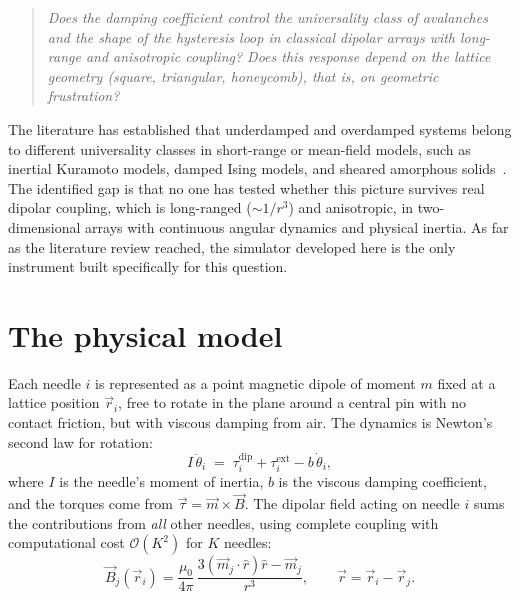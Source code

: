 \documentclass[11pt,a4paper]{article}
\begin{document}
\begin{quote}\itshape
Does the damping coefficient control the universality class of avalanches and the shape of the hysteresis loop in classical dipolar arrays with long-range and anisotropic coupling? Does this response depend on the lattice geometry (square, triangular, honeycomb), that is, on geometric frustration?
\end{quote}

The literature has established that underdamped and overdamped systems belong to different universality classes in short-range or mean-field models, such as inertial Kuramoto models, damped Ising models, and sheared amorphous solids~\cite{dahmen2011}. The identified gap is that no one has tested whether this picture survives real dipolar coupling, which is long-ranged ($\sim 1/r^3$) and anisotropic, in two-dimensional arrays with continuous angular dynamics and physical inertia. As far as the literature review reached, the simulator developed here is the only instrument built specifically for this question.

\section{The physical model}

Each needle $i$ is represented as a point magnetic dipole of moment $m$ fixed at a lattice position $\vec{r}_i$, free to rotate in the plane around a central pin with no contact friction, but with viscous damping from air. The dynamics is Newton's second law for rotation:
\begin{equation}
I\,\ddot\theta_i \;=\; \tau_i^{\mathrm{dip}} + \tau_i^{\mathrm{ext}}
- b\,\dot\theta_i,
\label{eq:eom}
\end{equation}
where $I$ is the needle's moment of inertia, $b$ is the viscous damping coefficient, and the torques come from $\vec\tau = \vec m \times \vec B$. The dipolar field acting on needle $i$ sums the contributions from \emph{all} other needles, using complete coupling with computational cost $\mathcal{O}(K^2)$ for $K$ needles:
\begin{equation}
\vec B_j(\vec r_i) = \frac{\mu_0}{4\pi}\,
\frac{3(\vec m_j \cdot \hat r)\hat r - \vec m_j}{r^3},
\qquad \vec r = \vec r_i - \vec r_j .
\end{equation}
\end{document}
